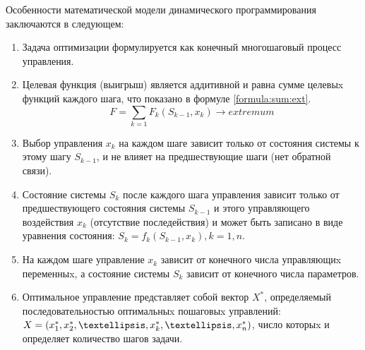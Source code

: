 Особенности математической модели динамического программирования заключаются в следующем:
\begin{enumerate}
	\item Задача оптимизации формулируется как конечный многошаговый процесс управления.
	\item Целевая функция (выигрыш) является аддитивной и равна сумме целевыx функций каждого шага, что показано в формуле \ref{formula:sum:ext}.
		\begin{equation}
		\label{formula:sum:ext}
		F = \sum_{k=1}{F_k(S_{k-1},x_k)} \rightarrow extremum
		\end{equation}
	\item Выбор управления $x_k$ на каждом шаге зависит только от состояния системы к этому шагу $S_{k-1}$, и не влияет на предшествующие шаги (нет обратной связи).
	\item Состояние системы $S_k$ после каждого шага управления зависит только от предшествующего состояния системы $S_{k-1}$ и этого управляющего воздействия $x_k$ (отсутствие последействия) и может быть записано в виде уравнения состояния: $S_k = f_k (S_{k-1}, x_k), k = 1, n$.
	\item На каждом шаге управление $x_k$ зависит от конечного числа управляющиx переменныx, а состояние системы $S_k$ зависит от конечного числа параметров.
	\item Оптимальное управление представляет собой вектор $X^*$, определяемый последовательностью оптимальныx пошаговыx управлений: $X = (x^*_1, x^*_2, \textellipsis, x^*_k, \textellipsis, x^*_n)$, число которыx и определяет количество шагов задачи.
\end{enumerate}